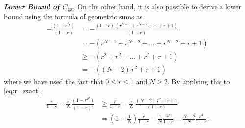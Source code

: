 \begin{proofEnd}
\textit{\textbf{Lower Bound of \(C_{\text{gap}}\)}}\quad
On the other hand, it is also possible to derive a lower bound using the formula of geometric sums as
\begin{align}
  -\frac{\left(1-r^N\right)}{{\left(1-r\right)}}
  &=
  -\frac{\left(1-r\right)\,\left(r^{N-1} + r^{N-2} + \ldots + r + 1\right)}{{\left(1-r\right)}}
  \\
  &=
  -\left(r^{N-1} + r^{N-2} + \ldots + r^{N-2} + r + 1\right)
  \\
  &\geq
  -\left(r^2 + r^2 + \ldots + r^2 +  r + 1\right)
  \\
  &=
  -\left((N-2)\,r^2 + r + 1\right)
\end{align}
where we have used the fact that \(0 \leq r \leq 1\) and \(N \geq 2\).
By applying this to \cref{eq:r_exact},
\begin{align}
 \frac{r}{1-r} -
 \frac{r}{N}\,\frac{\left(1-r^N\right)}{{\left(1-r\right)}^2}
 &\geq 
 \frac{r}{1-r} -
 \frac{r}{N}\,\frac{(N-2)\,r^2 + r + 1}{\left(1-r\right)}
 \\
 &=
 \left(1 - \frac{1}{N}\right) \frac{r}{1-r}
 -
 \frac{1}{N} \frac{r^2}{1-r}
 -
 \frac{N-2}{N} \frac{r^3}{1-r}.\label{eq:r_lowerbound}
\end{align}

\begin{figure}[H]
  \centering
\end{figure}
\end{proofEnd}
